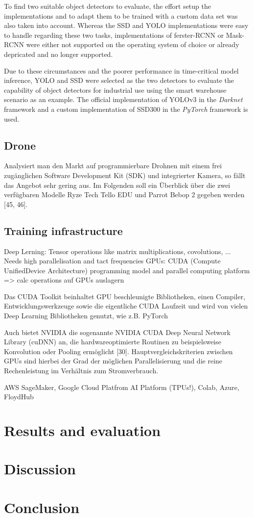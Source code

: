 \documentclass[a4paper, 10pt, journal]{wissarbIEEE}      %
\begin{document}
To find two suitable object detectors to evaluate, the effort setup the implementations and to adapt them to be trained with a custom data set was also taken into account. Whereas the SSD and YOLO implementations were easy to handle regarding these two tasks, implementations of ferster-RCNN or Mask-RCNN were either not supported on the operating system of choice or already depricated and no longer supported. 

Due to these circumstances and the poorer performance in time-critical model inference, YOLO and SSD were selected as the two detectors to evaluate the capability of object detectors for industrial use using the smart warehouse scenario as an example. The official implementation of YOLOv3 in the \textit{Darknet} framework and a custom implementation of SSD300 in the \textit{PyTorch} framework is used.

\subsection{Drone}

Analysiert man den Markt auf programmierbare Drohnen mit einem frei zugänglichen
Software Development Kit (SDK) und integrierter Kamera, so fällt das Angebot sehr
gering aus. Im Folgenden soll ein Überblick über die zwei verfügbaren Modelle Ryze
Tech Tello EDU und Parrot Bebop 2 gegeben werden [45, 46]. 

\subsection{Training infrastructure}

Deep Lerning: Tensor operations like matrix multiplications, covolutions, ...
Needs high parallelisation and tact frequencies
GPUs: CUDA (Compute UnifiedDevice Architecture) programming model and parallel computing platform => calc operations auf GPUs auslagern

Das CUDA Toolkit beinhaltet
GPU beschleunigte Bibliotheken, einen Compiler, Entwicklungswerkzeuge sowie die
eigentliche CUDA Laufzeit und wird von vielen Deep Learning Bibliotheken genutzt,
wie z.B. PyTorch

Auch bietet NVIDIA die sogenannte NVIDIA CUDA Deep
Neural Network Library (cuDNN) an, die hardwareoptimierte Routinen zu beispielsweise
Konvolution oder Pooling ermöglicht [30]. Hauptvergleichskriterien zwischen GPUs
sind hierbei der Grad der möglichen Parallelisierung und die reine Rechenleistung im
Verhältnis zum Stromverbrauch.

AWS SageMaker, Google Cloud Platfrom AI Platform (TPUs!), Colab, Azure, FloydHub

\section{Results and evaluation} \label{evaluation}

\section{Discussion} \label{results}

\section{Conclusion} \label{conclusion}


\end{document}
